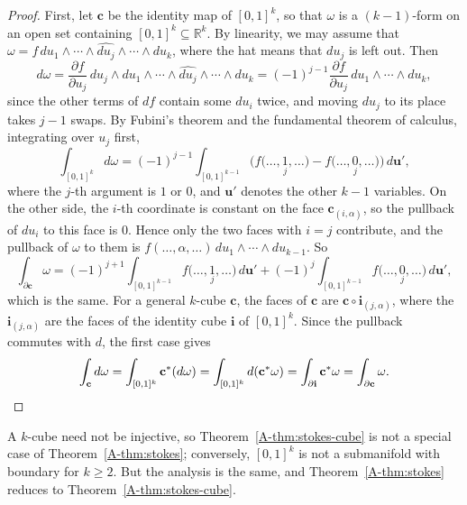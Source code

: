 \begin{proof}
    First, let $\mathbf{c}$ be the identity map of $[0, 1]^k$, so that $\omega$ is a $(k - 1)$-form on an open set containing $[0, 1]^k \subseteq \mathbb{R}^k$. By linearity, we may assume that $\omega = f\, du_1 \wedge \cdots \wedge \widehat{du_j} \wedge \cdots \wedge du_k$, where the hat means that $du_j$ is left out. Then
    \[d\omega = \frac{\partial f}{\partial u_j}\, du_j \wedge du_1 \wedge \cdots \wedge \widehat{du_j} \wedge \cdots \wedge du_k = (-1)^{j-1}\frac{\partial f}{\partial u_j}\, du_1 \wedge \cdots \wedge du_k,\]
    since the other terms of $df$ contain some $du_i$ twice, and moving $du_j$ to its place takes $j - 1$ swaps. By Fubini's theorem and the fundamental theorem of calculus, integrating over $u_j$ first,
    \[\int_{[0,1]^k} d\omega = (-1)^{j-1} \int_{[0,1]^{k-1}} \Big(f\big(\ldots, \underset{j}{1}, \ldots\big) - f\big(\ldots, \underset{j}{0}, \ldots\big)\Big)\, d\mathbf{u}',\]
    where the $j$-th argument is $1$ or $0$, and $\mathbf{u}'$ denotes the other $k - 1$ variables. On the other side, the $i$-th coordinate is constant on the face $\mathbf{c}_{(i, \alpha)}$, so the pullback of $du_i$ to this face is $0$. Hence only the two faces with $i = j$ contribute, and the pullback of $\omega$ to them is $f(\ldots, \alpha, \ldots)\, du_1 \wedge \cdots \wedge du_{k-1}$. So
    \[\int_{\partial\mathbf{c}} \omega = (-1)^{j+1} \int_{[0,1]^{k-1}} f\big(\ldots, \underset{j}{1}, \ldots\big)\, d\mathbf{u}' + (-1)^j \int_{[0,1]^{k-1}} f\big(\ldots, \underset{j}{0}, \ldots\big)\, d\mathbf{u}',\]
    which is the same. For a general $k$-cube $\mathbf{c}$, the faces of $\mathbf{c}$ are $\mathbf{c} \circ \mathbf{i}_{(j, \alpha)}$, where the $\mathbf{i}_{(j, \alpha)}$ are the faces of the identity cube $\mathbf{i}$ of $[0, 1]^k$. Since the pullback commutes with $d$, the first case gives
    \[\int_{\mathbf{c}} d\omega = \int_{[0,1]^k} \mathbf{c}^*(d\omega) = \int_{[0,1]^k} d(\mathbf{c}^*\omega) = \int_{\partial\mathbf{i}} \mathbf{c}^*\omega = \int_{\partial\mathbf{c}} \omega. \qedhere\]
\end{proof}

A $k$-cube need not be injective, so Theorem~\ref{A-thm:stokes-cube} is not a special case of Theorem~\ref{A-thm:stokes}; conversely, $[0, 1]^k$ is not a submanifold with boundary for $k \geq 2$. But the analysis is the same, and Theorem~\ref{A-thm:stokes} reduces to Theorem~\ref{A-thm:stokes-cube}.

